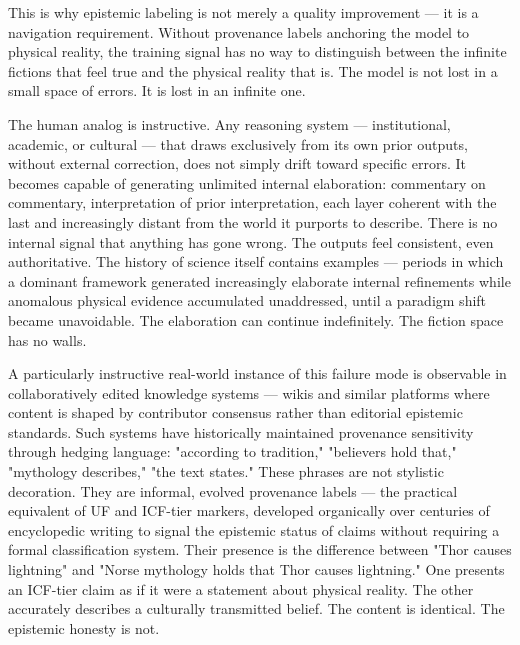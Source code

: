 \documentclass[12pt]{article}
\begin{document}
This is why epistemic labeling is not merely a quality improvement ---
it is a navigation requirement. Without provenance labels anchoring the
model to physical reality, the training signal has no way to distinguish
between the infinite fictions that feel true and the physical reality
that is. The model is not lost in a small space of errors. It is lost in
an infinite one.

The human analog is instructive. Any reasoning system --- institutional,
academic, or cultural --- that draws exclusively from its own prior
outputs, without external correction, does not simply drift toward
specific errors. It becomes capable of generating unlimited internal
elaboration: commentary on commentary, interpretation of prior
interpretation, each layer coherent with the last and increasingly
distant from the world it purports to describe. There is no internal
signal that anything has gone wrong. The outputs feel consistent, even
authoritative. The history of science itself contains examples ---
periods in which a dominant framework generated increasingly elaborate
internal refinements while anomalous physical evidence accumulated
unaddressed, until a paradigm shift became unavoidable. The elaboration
can continue indefinitely. The fiction space has no walls.

A particularly instructive real-world instance of this failure mode is
observable in collaboratively edited knowledge systems --- wikis and
similar platforms where content is shaped by contributor consensus
rather than editorial epistemic standards. Such systems have
historically maintained provenance sensitivity through hedging language:
"according to tradition," "believers hold that," "mythology describes,"
"the text states." These phrases are not stylistic decoration. They are
informal, evolved provenance labels --- the practical equivalent of UF
and ICF-tier markers, developed organically over centuries of
encyclopedic writing to signal the epistemic status of claims without
requiring a formal classification system. Their presence is the
difference between "Thor causes lightning" and "Norse mythology holds
that Thor causes lightning." One presents an ICF-tier claim as if it
were a statement about physical reality. The other accurately describes
a culturally transmitted belief. The content is identical. The epistemic
honesty is not.
\end{document}
